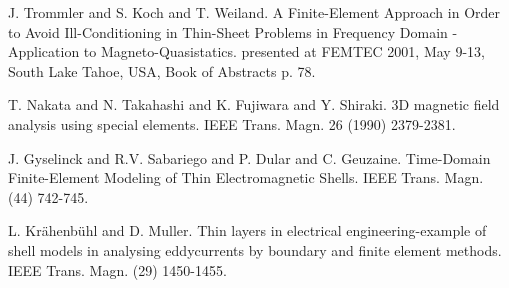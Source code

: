 
\begin{thebibliography}{10}

{\sc J. Trommler and S. Koch and T. Weiland}. {A Finite-Element Approach in Order to Avoid Ill-Conditioning in Thin-Sheet Problems in Frequency Domain - Application to Magneto-Quasistatics}. presented at FEMTEC 2001, May 9-13, South Lake Tahoe, USA, Book of Abstracts p. 78.



{\sc T. Nakata and N. Takahashi and K. Fujiwara and Y. Shiraki}. {3D magnetic field analysis using special elements}. IEEE Trans. Magn. 26 (1990) 2379-2381.



{\sc J. Gyselinck and R.V. Sabariego and P. Dular and C. Geuzaine}. {Time-Domain Finite-Element Modeling of Thin Electromagnetic Shells}. IEEE Trans. Magn. (44) 742-745.



{\sc L. Kr\"ahenb\"uhl and D. Muller}. {Thin layers in electrical engineering-example of shell models in analysing eddycurrents by boundary and finite element methods}. IEEE Trans. Magn. (29) 1450-1455.

\end{thebibliography}

